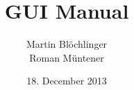 \title{GUI Manual}
\date{18. December 2013}
\author{Martin Blöchlinger \\ Roman Müntener}
\maketitle
\thispagestyle{empty}
\newpage
